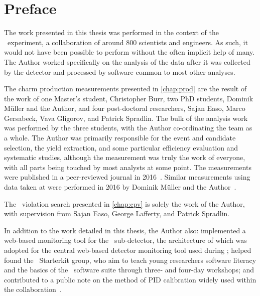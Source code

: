 \chapter{Preface}


The work presented in this thesis was performed in the context of the \lhcb\ 
experiment, a collaboration of around 800 scientists and engineers.
As such, it would not have been possible to perform without the often implicit 
help of many.
The Author worked specifically on the analysis of the data after it was 
collected by the detector and processed by software common to most other 
analyses.

The charm production measurements presented in \cref{chap:prod} are the result 
of the work of one Master's student, Christopher Burr, two PhD students, 
Dominik M\"{u}ller and the Author, and four post-doctoral researchers, Sajan 
Easo, Marco Gersabeck, Vava Gligorov, and Patrick Spradlin.
The bulk of the analysis work was performed by the three students, with the 
Author co-ordinating the team as a whole.
The Author was primarily responsible for the event and candidate selection, the 
yield extraction, and some particular efficiency evaluation and systematic 
studies, although the measurement was truly the work of everyone, with all 
parts being touched by most analysts at some point.
The measurements were published in a peer-reviewed journal in 
2016~\cite{Aaij:2015bpa}.
Similar measurements using data taken at  were performed in 2016 by 
Dominik M\"{u}ller and the Author~\cite{Aaij:2016jht}.

The \CP\ violation search presented in \cref{chap:cpv} is solely the work of 
the Author, with supervision from Sajan Easo, George Lafferty, and Patrick 
Spradlin.

In addition to the work detailed in this thesis, the Author also: implemented a 
web-based monitoring tool for the \velo\ sub-detector, the architecture of 
which was adopted for the central web-based detector monitoring tool used 
during \runtwo; helped found the \lhcb\ Starterkit group, who aim to teach 
young researchers software literacy and the basics of the \lhcb\ software suite 
through three- and four-day workshops; and contributed to a public note on the 
method of \acl*{PID} calibration widely used within the 
collaboration~\cite{Anderlini:2202412}.
